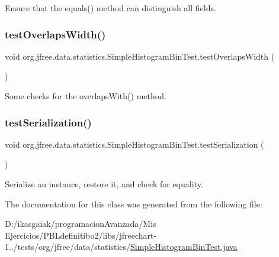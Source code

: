 Ensure that the equals() method can distinguish all fields. \mbox{\label{classorg_1_1jfree_1_1data_1_1statistics_1_1_simple_histogram_bin_test_a22921caed49a1442ff9a0a618fa2efdf}} 
\subsubsection{\texorpdfstring{test\+Overlaps\+Width()}{testOverlapsWidth()}}
{\footnotesize\ttfamily void org.\+jfree.\+data.\+statistics.\+Simple\+Histogram\+Bin\+Test.\+test\+Overlaps\+Width (\begin{DoxyParamCaption}{ }\end{DoxyParamCaption})}

Some checks for the overlaps\+With() method. \mbox{\label{classorg_1_1jfree_1_1data_1_1statistics_1_1_simple_histogram_bin_test_a247639ce817f8d9585529108a0652e06}} 
\subsubsection{\texorpdfstring{test\+Serialization()}{testSerialization()}}
{\footnotesize\ttfamily void org.\+jfree.\+data.\+statistics.\+Simple\+Histogram\+Bin\+Test.\+test\+Serialization (\begin{DoxyParamCaption}{ }\end{DoxyParamCaption})}

Serialize an instance, restore it, and check for equality. 

The documentation for this class was generated from the following file\+:\begin{DoxyCompactItemize}
\item 
D\+:/ikasgaiak/programacion\+Avanzada/\+Mis Ejercicios/\+P\+B\+Ldefinitibo2/libs/jfreechart-\/1../tests/org/jfree/data/statistics/\mbox{\hyperlink{_simple_histogram_bin_test_8java}{Simple\+Histogram\+Bin\+Test.\+java}}\end{DoxyCompactItemize}

